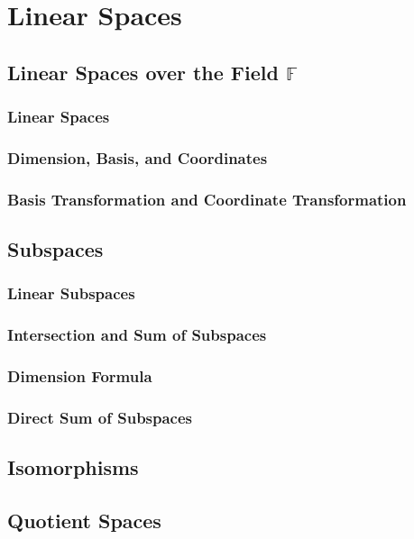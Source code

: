 \documentclass[11pt]{../../TexTemplate/elegantbook} %
\begin{document}
\chapter{Linear Spaces}
\section{Linear Spaces over the Field \(\mathbb{F}\)}

\subsection{Linear Spaces}

\subsection{Dimension, Basis, and Coordinates}

\subsection{Basis Transformation and Coordinate Transformation}

\section{Subspaces}

\subsection{Linear Subspaces}

\subsection{Intersection and Sum of Subspaces}

\subsection{Dimension Formula}

\subsection{Direct Sum of Subspaces}

\section{Isomorphisms}

\section{Quotient Spaces}
\end{document}
